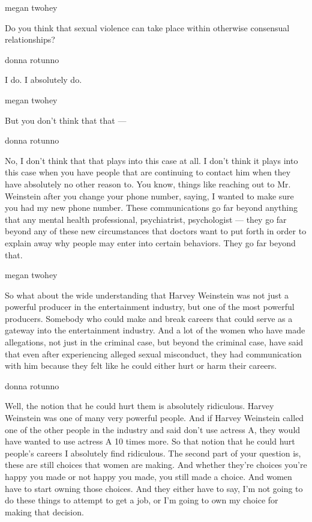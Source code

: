 megan twohey

Do you think that sexual violence can take place within otherwise
consensual relationships?

donna rotunno

I do. I absolutely do.

megan twohey

But you don't think that that ---

donna rotunno

No, I don't think that that plays into this case at all. I don't think
it plays into this case when you have people that are continuing to
contact him when they have absolutely no other reason to. You know,
things like reaching out to Mr. Weinstein after you change your phone
number, saying, I wanted to make sure you had my new phone number. These
communications go far beyond anything that any mental health
professional, psychiatrist, psychologist --- they go far beyond any of
these new circumstances that doctors want to put forth in order to
explain away why people may enter into certain behaviors. They go far
beyond that.

megan twohey

So what about the wide understanding that Harvey Weinstein was not just
a powerful producer in the entertainment industry, but one of the most
powerful producers. Somebody who could make and break careers that could
serve as a gateway into the entertainment industry. And a lot of the
women who have made allegations, not just in the criminal case, but
beyond the criminal case, have said that even after experiencing alleged
sexual misconduct, they had communication with him because they felt
like he could either hurt or harm their careers.

donna rotunno

Well, the notion that he could hurt them is absolutely ridiculous.
Harvey Weinstein was one of many very powerful people. And if Harvey
Weinstein called one of the other people in the industry and said don't
use actress A, they would have wanted to use actress A 10 times more. So
that notion that he could hurt people's careers I absolutely find
ridiculous. The second part of your question is, these are still choices
that women are making. And whether they're choices you're happy you made
or not happy you made, you still made a choice. And women have to start
owning those choices. And they either have to say, I'm not going to do
these things to attempt to get a job, or I'm going to own my choice for
making that decision.

